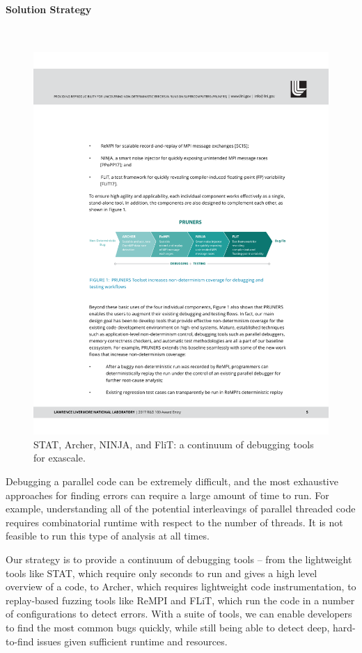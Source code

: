 \paragraph{Solution Strategy} \leavevmode \\

\begin{figure}[htb]
\centering
\includegraphics[width=\textwidth]{projects/2.3.6-NNSA/2.3.6.02-LLNL-ATDM/pruners}
\caption{
STAT, Archer, NINJA, and FliT: a continuum of debugging tools for exascale.
}
\end{figure}

Debugging a parallel code can be extremely difficult, and the most
exhaustive approaches for finding errors can require a large amount of
time to run.  For example, understanding all of the potential
interleavings of parallel threaded code requires combinatorial runtime
with respect to the number of threads.  It is not feasible to run this
type of analysis at all times.

Our strategy is to provide a continuum of debugging tools -- from the
lightweight tools like STAT, which require only seconds to run and gives
a high level overview of a code, to Archer, which requires lightweight
code instrumentation, to replay-based fuzzing tools like ReMPI and FLiT,
which run the code in a number of configurations to detect errors.  With
a suite of tools, we can enable developers to find the most common bugs
quickly, while still being able to detect deep, hard-to-find issues given
sufficient runtime and resources.



